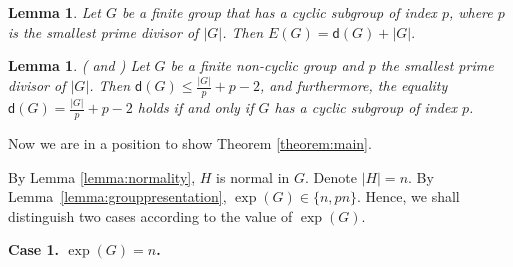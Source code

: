 \documentclass[a4paper, 12pt]{article}
\newtheorem{lemma}[theorem]{Lemma}
\theoremstyle{definition}
\begin{document}
\begin{lemma}\cite{QuGaoLi}\label{lemma:E(G)=d+|G|} Let $G$ be a finite group that has a cyclic subgroup of index $p$, where $p$ is the smallest prime divisor of $|G|$. Then $E(G)=\mathsf d(G)+|G|.$
\end{lemma}

\begin{lemma} (\cite{QuLiTeeuwsenJCTA} and \cite[Corollary 1.3]{QLT}) \label{Lemma:smalld(G)} Let $G$ be a finite non-cyclic group and $p$ the smallest prime divisor of $|G|$. Then $\mathsf d(G)\leq \frac{|G|}{p}+p-2$, and furthermore, the equality  $\mathsf d(G)=\frac{|G|}{p}+p-2$ holds if and only if
$G$ has a cyclic subgroup of index $p$.
\end{lemma}


Now we are in a position to show Theorem \ref{theorem:main}.



\bigskip

  By Lemma \ref{lemma:normality}, $H$ is normal in $G$. Denote $|H|=n$. By Lemma~\ref{lemma:grouppresentation}, $\exp(G)\in \{n,pn\}$. Hence,
we shall distinguish two cases according to the value of $\exp(G)$.

\medskip

\noindent \textbf{Case 1. $\exp(G)=n$.}
\end{document}
